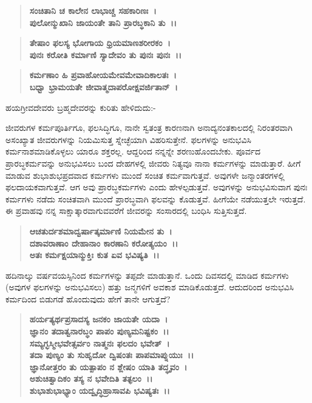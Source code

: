 \begin{verse}
\textbf{ಸಂಚಿತಾನಿ ಚ ಕಾಲೇನ ಲಾಭಾಚ್ಚ ಸಹಕಾರಿಣಃ~।}\\\textbf{ಪುಲೋನ್ಮುಖಾನಿ ಜಾಯಂತೇ ತಾನಿ ಪ್ರಾರಬ್ಧಕಾನಿ ತು~।।}
\end{verse}

\begin{verse}
\textbf{ತೇಷಾಂ ಫಲಸ್ಯ ಭೋಗಾಯ ಧ್ರಿಯಮಾಣಶರೀರಕಂ~।}\\\textbf{ಪುನಃ ಕರೋತಿ ಕರ್ಮಾಣಿ ಸ್ಯಾದೇವಂ ತು ಪುನಃ ಪುನಃ~।।}
\end{verse}

\begin{verse}
\textbf{ಕರ್ಮಣಾಂ ಹಿ ಪ್ರವಾಹೋಯಮೇವಮೇವಾದಿಕಾಲತಃ~।}\\\textbf{ಬಧ್ವಾ ಭ್ರಾಮಯತೇ ಜೀವಾತ್ಮದಾಪರೋಕ್ಷವರ್ಜಿತಾನ್~।}
\end{verse}


ಹಯಗ್ರೀವದೇವರು ಬ್ರಹ್ಮದೇವರನ್ನು ಕುರಿತು ಹೇಳಿದುದು:-

ಜೀವರುಗಳ ಕರ್ಮಪೂರ್ತಿಗೂ, ಫಲಸಿದ್ಧಿಗೂ, ನಾನೇ ಸ್ವತಂತ್ರ ಕಾರಣನಾಗಿ ಅನಾದ್ಯನಂತಕಾಲದಲ್ಲಿ ನಿರಂತರವಾಗಿ ಅಸಂಖ್ಯಾತ ಜೀವರುಗಳನ್ನು ನಿಯಮಿಸುತ್ತ ಸ್ನೇಚ್ಛೆಯಾಗಿ ವಿಹರಿಸುತ್ತೇನೆ. ಫಲಗಳನ್ನು ಅನುಭವಿಸಿ ಕರ್ಮನಾಶಮಾಡಿಕೊಳ್ಳಲು ಯಾರೂ ಶಕ್ತರಲ್ಲ. ಆದ್ದರಿಂದ ನನ್ನನ್ನೇ ಶರಣುಹೊಂದಬೇಕು. ಪೂರ್ವದ ಪ್ರಾರಬ್ಧಕರ್ಮವನ್ನು ಅನುಭವಿಸಲು ಬಂದ ದೇಹಗಳಲ್ಲಿ ಜೀವರು ನಿತ್ಯವೂ ನಾನಾ ಕರ್ಮಗಳನ್ನು ಮಾಡುತ್ತಾರೆ. ಹೀಗೆ ಮಾಡುವ ಶುಭಾಶುಭಪ್ರದವಾದ ಕರ್ಮಗಳು ಮುಂದೆ ಸಂಚಿತ ಕರ್ಮವಾಗುತ್ತವೆ. ಅವುಗಳೇ ಜನ್ಮಾಂತರಗಳಲ್ಲಿ ಫಲದಾಯಕವಾಗುತ್ತವೆ. ಆಗ ಅವು ಪ್ರಾರಬ್ಧಕರ್ಮಗಳು ಎಂದು ಹೇಳಲ್ಪಡುತ್ತವೆ. ಅವುಗಳನ್ನು ಅನುಭವಿಸುವಾಗ ಪುನಃ ಕರ್ಮಗಳು ನಡೆದು ಸಂಚಿತವಾಗಿ ಮುಂದೆ ಪ್ರಾರಬ್ಧವಾಗಿ ಫಲವನ್ನು ಕೊಡುತ್ತವೆ. ಹೀಗೆಯೇ ನಡೆಯುತ್ತಲೇ ಇರುತ್ತದೆ. ಈ ಪ್ರವಾಹವು ನನ್ನ ಸಾಕ್ಷಾತ್ಕಾರವಾಗುವವರೆಗೆ ಜೀವರನ್ನು ಸಂಸಾರದಲ್ಲಿ ಬಂಧಿಸಿ ಸುತ್ತಿಸುತ್ತದೆ.

\begin{verse}
\textbf{ಆಚತುರ್ದಶಮಾದ್ವರ್ಷಾತ್ಕರ್ಮಾಣಿ ನಿಯಮೇನ ತು~।}\\\textbf{ದಶಾವರಾಣಾಂ ದೇಹಾನಾಂ ಕಾರಣಾನಿ ಕರೋತ್ಯಯಂ~।।}\\\textbf{ಅತಃ ಕರ್ಮಕ್ಷಯಾನ್ಮುಕ್ತಿಃ ಕುತ ಏವ ಭವಿಷ್ಯತಿ~।।}
\end{verse}

ಹದಿನಾಲ್ಕು ವರ್ಷವಯಸ್ಸಿನಿಂದ ಕರ್ಮಗಳನ್ನು ತಪ್ಪದೇ ಮಾಡುತ್ತಾನೆ. ಒಂದು ದಿವಸದಲ್ಲಿ ಮಾಡಿದ ಕರ್ಮಗಳು (ಅವುಗಳ ಫಲಗಳನ್ನು ಅನುಭವಿಸಲು) ಹತ್ತು ಜನ್ಮಗಳಿಗೆ ಅವಕಾಶ ಮಾಡಿಕೊಡುತ್ತದೆ. ಆದುದರಿಂದ ಅನುಭವಿಸಿ ಕರ್ಮದಿಂದ ಬಿಡುಗಡೆ ಹೊಂದುವುದು ಹೇಗೆ ತಾನೇ ಆಗುತ್ತದೆ?

\begin{verse}
\textbf{ಹರ್ಯತ್ಯರ್ಥಪ್ರಸಾದಸ್ಯ ಜನಕಂ ಜಾಯತೇ ಯದಾ~।}\\\textbf{ಜ್ಞಾನಂ ತದಾತ್ವನಾರಬ್ಧಂ ಪಾಪಂ ಪುಣ್ಯಮನಿಷ್ಟಕಂ~।।}\\\textbf{ಸಮ್ಯಗ್ಭಸ್ಮೀಭವೇತ್ಸರ್ವಂ ನಾತ್ಮನಃ ಫಲದಂ ಭವೇತ್~।}\\\textbf{ತದಾ ಪುಣ್ಯಂ ತು ಸುಹೃದೋ ದ್ವಿಷಂತಃ ಪಾಪಮಾಪ್ನುಯುಃ~।।}\\\textbf{ಜ್ಞಾನೋತ್ತರಂ ತು ಯತ್ಪಾಪಂ ನ ಶ್ಲೇಷಂ ಯಾತಿ ತದ್ಧೃವಂ~।}\\\textbf{ಅಶುಚಿತ್ವಾದಿಕಂ ತಸ್ಯ ನ ಭವೇದಿತಿ ತತ್ಫಲಂ~।।}\\\textbf{ಶುಭಾಶುಭಾಭ್ಯಾಂ ಯದ್ವೃದ್ಧಿಹ್ರಾಸಾವಪಿ ಭವಿಷ್ಯತಃ~।।}
\end{verse}

